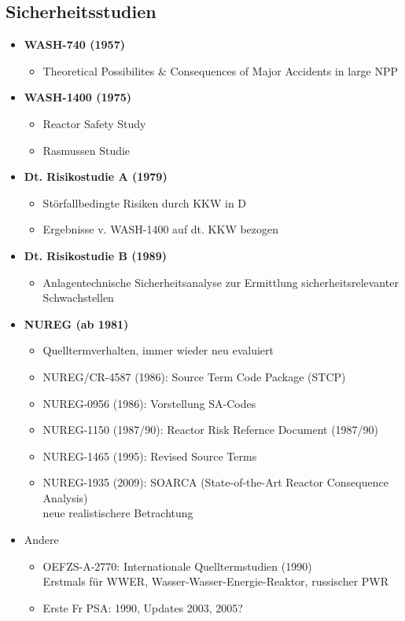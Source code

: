 \documentclass[12pt]{article}
\begin{document}
\subsection{Sicherheitsstudien}
\begin{itemize}
  \item \textbf{WASH-740 (1957)}
  \begin{itemize}
    \item Theoretical Possibilites \& Consequences of Major Accidents in large NPP
  \end{itemize}

  \item \textbf{WASH-1400 (1975)}
  \begin{itemize}
    \item Reactor Safety Study
    \item Rasmussen Studie
  \end{itemize}

  \item \textbf{Dt. Risikostudie A (1979)}
  \begin{itemize}
    \item Störfallbedingte Risiken durch KKW in D
    \item Ergebnisse v. WASH-1400 auf dt. KKW bezogen
  \end{itemize}

  \item \textbf{Dt. Risikostudie B (1989)}
  \begin{itemize}
    \item Anlagentechnische Sicherheitsanalyse zur Ermittlung sicherheitsrelevanter Schwachstellen
  \end{itemize}

  \item \textbf{NUREG (ab 1981)}
  \begin{itemize}
    \item Quelltermverhalten, immer wieder neu evaluiert
    \item NUREG/CR-4587 (1986): Source Term Code Package (STCP)
    \item NUREG-0956 (1986): Vorstellung SA-Codes
    \item NUREG-1150 (1987/90): Reactor Risk Refernce Document (1987/90)
    \item NUREG-1465 (1995): Revised Source Terms
    \item NUREG-1935 (2009): SOARCA (State-of-the-Art Reactor Consequence Analysis)\\
          neue realistischere Betrachtung
  \end{itemize}

  \item Andere
  \begin{itemize}
    \item OEFZS-A-2770: Internationale Quelltermstudien (1990)\\
          Erstmals für WWER, Wasser-Wasser-Energie-Reaktor, russischer PWR
    \item Erste Fr PSA: 1990, Updates 2003, 2005?
  \end{itemize}

\end{itemize}
\end{document}
